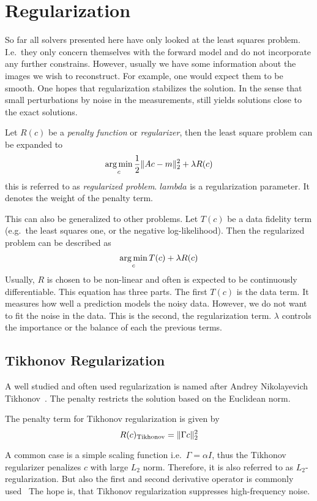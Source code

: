 \section{Regularization}\label{sec:regularization}

So far all solvers presented here have only looked at the least squares problem. I.e.\ they only
concern themselves with the forward model and do not incorporate any further constrains. However,
usually we have some information about the images we wish to reconstruct. For example, one would
expect them to be smooth. One hopes that regularization stabilizes the solution. In the sense that
small perturbations by noise in the measurements, still yields solutions close to the exact
solutions.

\begin{definition}\label{def:regularized_problem}
	Let \(R(c)\) be a \textit{penalty function} or \textit{regularizer}, then the least square
	problem can be expanded to
	\[
		\operatorname*{arg\,min}_c \frac{1}{2} \lVert A c - m\rVert_2^2 + \lambda R(c)
	\]
	this is referred to as \textit{regularized problem}. \(lambda\) is a regularization
	parameter. It denotes the weight of the penalty term.
\end{definition}

This can also be generalized to other problems. Let \(T(c)\) be a data fidelity term (e.g.\
the least squares one, or the negative log-likelihood). Then the regularized problem can be
described as
\[ \operatorname*{arg\,min}_c T(c) + \lambda R(c) \]
Usually, \(R\) is chosen to be non-linear and often is expected to be continuously differentiable.
This equation has three parts. The first \(T(c)\) is the data term. It measures how well a
prediction models the noisy data. However, we do not want to fit the noise in the data. This is the
second, the regularization term. \(\lambda\) controls the importance or the balance of each the
previous terms.

\subsection{Tikhonov Regularization}\label{subsec:tikhonov_regularization}

A well studied and often used regularization is named after Andrey Nikolayevich
Tikhonov~\cite{tihonov_solution_1963}. The penalty restricts the solution based on the Euclidean
norm.

\begin{definition}\label{def:tikhonov_regularization}
	The penalty term for Tikhonov regularization is given by
	\[
		R(c)_{\text{Tikhonov}} = \lVert\Gamma c\rVert_2^2
	\]
\end{definition}
A common case is a simple scaling function i.e.\ \(\Gamma = \alpha I\), thus the Tikhonov
regularizer penalizes \(c\) with large \(L_2\) norm. Therefore, it is also referred to as
\(L_2\)-regularization. But also the first and second derivative operator is commonly
used~\cite{golub_tikhonov_1999} The hope is, that Tikhonov regularization suppresses high-frequency
noise.

